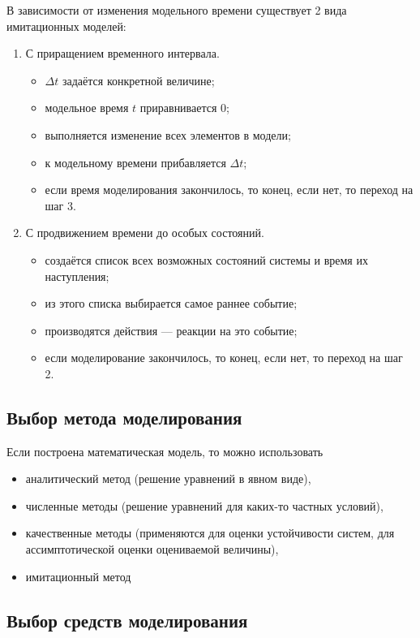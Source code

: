 \documentclass[12pt, russian, oneside, article]{ncc}
\begin{document}
В зависимости от изменения модельного времени существует 2 вида имитационных моделей:
\begin{enumerate}
\item С приращением временного интервала.

\begin{itemize}
\item $\Delta t$ задаётся конкретной величине;
\item модельное время $t$ приравнивается 0;
\item выполняется изменение всех элементов в модели;
\item к модельному времени прибавляется $\Delta t$;
\item если время моделирования закончилось, то конец, если нет, то переход на шаг 3.
\end{itemize}

\item С продвижением времени до особых состояний.

\begin{itemize}
\item создаётся список всех возможных состояний системы и время их наступления;
\item из этого списка выбирается самое раннее событие;
\item производятся действия --- реакции на это событие;
\item если моделирование закончилось, то конец, если нет, то переход на шаг 2.
\end{itemize}

\end{enumerate}
\subsection{Выбор метода моделирования}
\label{sec-4_7}


Если построена математическая модель, то можно использовать 
\begin{itemize}
\item аналитический метод (решение уравнений в явном виде),
\item численные методы (решение уравнений для каких-то частных условий),
\item качественные методы (применяются для оценки устойчивости систем, для ассимптотической оценки оцениваемой величины),
\item имитационный метод
\end{itemize}
\subsection{Выбор средств моделирования}
\label{sec-4_8}
\end{document}
